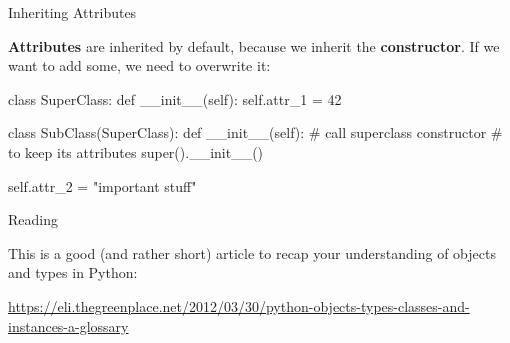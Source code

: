 \begin{frame}[fragile]{Inheriting Attributes}

    {\bf Attributes} are inherited by default, because we inherit the {\bf constructor}. If we want to add some, we need to overwrite it:

    \vspace{0.7em}

    \begin{pythoncode}
class SuperClass:
    def __init__(self):
        self.attr_1 = 42

class SubClass(SuperClass):
    def __init__(self):
        # call superclass constructor
        # to keep its attributes
        super().__init__()

        self.attr_2 = "important stuff"
    \end{pythoncode}

\end{frame}

\begin{frame}{Reading}

    This is a good (and rather short) article to recap your understanding of objects and types in Python:

    \vspace{1em}

    \url{https://eli.thegreenplace.net/2012/03/30/python-objects-types-classes-and-instances-a-glossary}

\end{frame}


